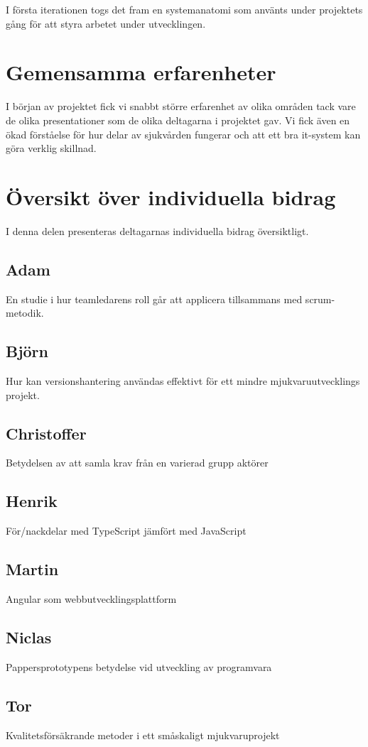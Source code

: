 I första iterationen togs det fram en systemanatomi som använts under
projektets gång för att styra arbetet under utvecklingen.


\section{Gemensamma erfarenheter}
I början av projektet fick vi snabbt större erfarenhet av olika områden
tack vare de olika presentationer som de olika deltagarna i projektet gav.
Vi fick även en ökad förståelse för hur delar av sjukvården fungerar och att ett bra
it-system kan göra verklig skillnad.

\section{Översikt över individuella bidrag}
I denna delen presenteras deltagarnas individuella bidrag översiktligt.

\subsection{Adam}
En studie i hur teamledarens roll går att applicera tillsammans med scrum-metodik.
\subsection{Björn}
Hur kan versionshantering användas effektivt för ett mindre mjukvaruutvecklings projekt.
\subsection{Christoffer}
Betydelsen av att samla krav från en varierad grupp aktörer
\subsection{Henrik}
För/nackdelar med TypeScript jämfört med JavaScript
\subsection{Martin}
Angular som webbutvecklingsplattform
\subsection{Niclas}
Pappersprototypens betydelse vid utveckling av programvara
\subsection{Tor}
Kvalitetsförsäkrande metoder i ett småskaligt mjukvaruprojekt
